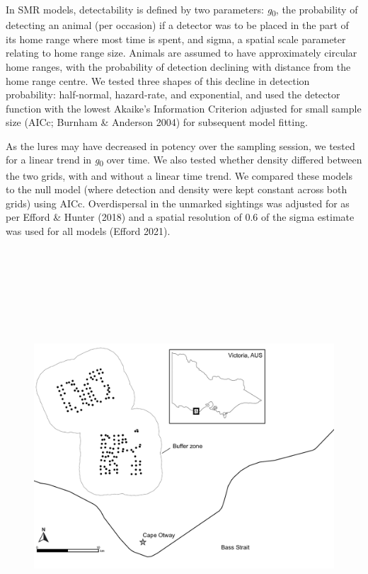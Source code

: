 \documentclass[11pt,a4paper,titlepage,twoside,openright]{style/unimelbthesis}
\begin{document}
\begin{mainmatter}
In SMR models, detectability is defined by two parameters: \emph{g}\textsubscript{0}, the probability of detecting an animal (per occasion) if a detector was to be placed in the part of its home range where most time is spent, and sigma, a spatial scale parameter relating to home range size. Animals are assumed to have approximately circular home ranges, with the probability of detection declining with distance from the home range centre. We tested three shapes of this decline in detection probability: half‐normal, hazard‐rate, and exponential, and used the detector function with the lowest Akaike's Information Criterion adjusted for small sample size (AICc; Burnham \& Anderson 2004) for subsequent model fitting.

As the lures may have decreased in potency over the sampling session, we tested for a linear trend in \emph{g}\textsubscript{0} over time. We also tested whether density differed between the two grids, with and without a linear time trend. We compared these models to the null model (where detection and density were kept constant across both grids) using AICc. Overdispersal in the unmarked sightings was adjusted for as per Efford \& Hunter (2018) and a spatial resolution of 0.6 of the sigma estimate was used for all models (Efford 2021).

\newpage

\(~\)

\(~\)

\(~\)

\(~\)
\begin{figure}

\hfill{}\includegraphics[width=1\linewidth]{figure/c2/c2_map} 


\end{figure}
\end{mainmatter}
\end{document}
